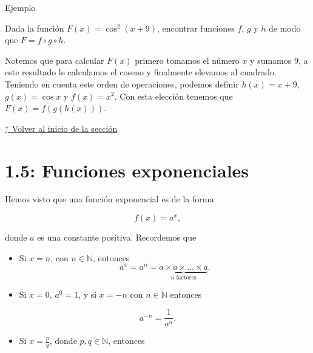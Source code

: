 \documentclass[
  letterpaper,
]{book}
\providecommand{\tightlist}{%
  \setlength{\itemsep}{0pt}\setlength{\parskip}{0pt}}
\theoremstyle{plain}
\theoremstyle{remark}
\begin{document}
Ejemplo

Dada la función \(F(x)=\cos^2(x+9)\), encontrar funciones \(f\), \(g\) y
\(h\) de modo que \(F=f\circ g\circ h\).

\begin{tcolorbox}[enhanced jigsaw, opacityback=0, left=2mm, opacitybacktitle=0.6, toprule=.15mm, bottomrule=.15mm, colbacktitle=quarto-callout-tip-color!10!white, titlerule=0mm, bottomtitle=1mm, title=\textcolor{quarto-callout-tip-color}{\faLightbulb}\hspace{0.5em}{Solución}, toptitle=1mm, colframe=quarto-callout-tip-color-frame, colback=white, breakable, rightrule=.15mm, arc=.35mm, leftrule=.75mm, coltitle=black]

Notemos que para calcular \(F(x)\) primero tomamos el número \(x\) y
sumamos 9, a este resultado le calculamos el coseno y finalmente
elevamos al cuadrado. Teniendo en cuenta este orden de operaciones,
podemos definir \(h(x)=x+9\), \(g(x)=\cos x\) y \(f(x)=x^2\). Con esta
elección tenemos que \(F(x)=f(g(h(x)))\).

\end{tcolorbox}

\hyperref[seccion_1.3]{↑ Volver al inicio de la sección}

\section{1.5: Funciones exponenciales}\label{seccion_1.5}

Hemos visto que una función exponencial es de la forma

\[
f(x)=a^x,
\]

donde \(a\) es una constante positiva. Recordemos que

\begin{itemize}
\item
  Si \(x=n\), con \(n\in\mathbb{N}\), entonces \[
  a^x=a^n=\underbrace{a\times a\times \dots \times a}_{n \text{ factores}}.
  \]
\item
  Si \(x=0\), \(a^0=1\), y si \(x=-n\) con \(n\in\mathbb{N}\) entonces
\end{itemize}

\[
a^{-n}=\frac{1}{a^n}.
\]

\begin{itemize}
\tightlist
\item
  Si \(x=\displaystyle \frac{p}{q}\), donde \(p,q\in \mathbb{N}\),
  entonces
\end{itemize}
\end{document}

